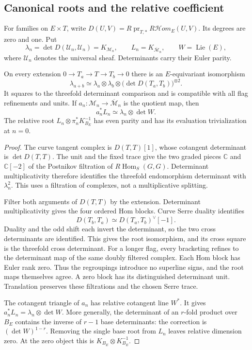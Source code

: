 \subsection{Canonical roots and the relative coefficient}

For families on $E\times T$, write
$D(U,V)=R\operatorname{pr}_{T,*}R\mathcal Hom_E(U,V)$.
Its degrees are zero and one. Put
\[
 \lambda_n=\det D(\mathcal U_n,\mathcal U_n)=K_{\mathcal M_n},\qquad
 L_n=K_{\overline{\mathcal M}_n},\qquad W=\operatorname{Lie}(E),
\]
where $\mathcal U_n$ denotes the universal sheaf. Determinants
carry their Euler parity.

\begin{proposition}\label{gh:roots}
On every extension $0\to T_a\to T\to T_b\to0$ there is an
$E$-equivariant isomorphism
\[
 \lambda_{a+b}\simeq
 \lambda_a\otimes\lambda_b\otimes
                  \bigl(\det D(T_a,T_b)\bigr)^{\otimes2}.
\]
It squares to the threefold determinant comparison and is compatible
with all flag refinements and units. If
$a_n:\mathcal M_n\to\overline{\mathcal M}_n$ is the quotient map, then
\[
 a_n^*L_n\simeq\lambda_n\otimes\det W.
\]
The relative root $L_n\otimes\pi_n^*K_{B_E}^{-1}$ has even parity and
has its evaluation trivialization at $n=0$.
\end{proposition}
\begin{proof}
The curve tangent complex is $D(T,T)[1]$, whose cotangent determinant
is $\det D(T,T)$. The unit and the fixed trace give the two graded
pieces $\mathbb C$ and $\mathbb C[-2]$ of the Postnikov filtration of
$R\operatorname{Hom}_S(G,G)$. Determinant multiplicativity therefore
identifies the threefold endomorphism determinant with $\lambda_n^2$.
This uses a filtration of complexes, not a multiplicative splitting.

Filter both arguments of $D(T,T)$ by the extension. Determinant
multiplicativity gives the four ordered Hom blocks. Curve Serre
duality identifies
\[
 D(T_b,T_a)\simeq D(T_a,T_b)^\vee[-1].
\]
Duality and the odd shift each invert the determinant, so the two
cross determinants are identified. This gives the root isomorphism,
and its cross square is the threefold cross determinant.
For a longer flag, every bracketing refines to the determinant map of
the same doubly filtered complex. Each Hom block has Euler rank zero.
Thus the regroupings introduce no superline signs, and the root maps
themselves agree. A zero block has its distinguished determinant unit.
Translation preserves these filtrations and the chosen Serre trace.

The cotangent triangle of $a_n$ has relative cotangent line $W^*$.
It gives $a_n^*L_n=\lambda_n\otimes\det W$.
More generally, the determinant of an $r$-fold product over $B_E$
contains the inverse of $r-1$ base determinants: the correction is
$(\det W)^{1-r}$. Removing the single base root from $L_n$ leaves
relative dimension zero. At the zero object this is
$K_{B_E}\otimes K_{B_E}^{-1}$.
\end{proof}

